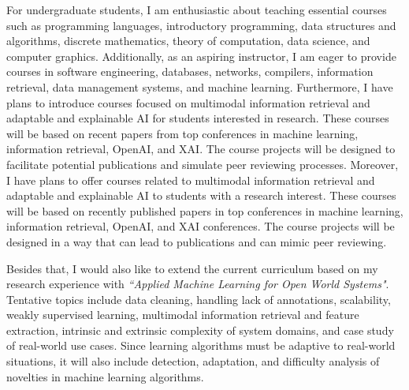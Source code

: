 For undergraduate students, I am enthusiastic about teaching essential courses such as programming languages, introductory programming, data structures and algorithms, discrete mathematics, theory of computation, data science, and computer graphics. Additionally, as an aspiring instructor, I am eager to provide courses in software engineering, databases, networks, compilers, information retrieval, data management systems, and machine learning. Furthermore, I have plans to introduce courses focused on multimodal information retrieval and adaptable and explainable AI for students interested in research. These courses will be based on recent papers from top conferences in machine learning, information retrieval, OpenAI, and XAI. The course projects will be designed to facilitate potential publications and simulate peer reviewing processes.
Moreover, I have plans to offer courses related to multimodal information retrieval and adaptable and explainable AI to students with a research interest. 
These courses will be based on recently published papers in top conferences in machine learning, information retrieval, OpenAI, and XAI conferences. The course projects will be designed in a way that can lead to publications and can mimic peer reviewing. 
%

Besides that, I would also like to extend the current curriculum based on my research experience with \textit{``Applied Machine Learning for Open World Systems"}. Tentative topics include data cleaning, handling lack of annotations, scalability, weakly supervised learning, multimodal information retrieval and feature extraction, intrinsic and extrinsic complexity of system domains, and case study of real-world use cases. Since learning algorithms must be adaptive to real-world situations, it will also include detection, adaptation, and difficulty analysis of novelties in machine learning algorithms.

